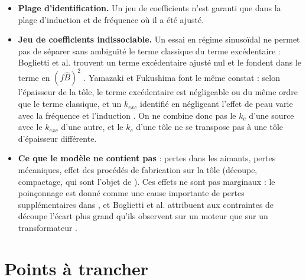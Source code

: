 \documentclass[11pt,a4paper]{article}
\newcommand{\Bc}{\hat{B}}
\begin{document}
\begin{itemize}
    \item \textbf{Plage d'identification.} Un jeu de coefficients n'est garanti que dans la plage d'induction et de fréquence où il a été ajusté.
    \item \textbf{Jeu de coefficients indissociable.} Un essai en régime sinusoïdal ne permet pas de séparer sans ambiguïté le terme classique du terme excédentaire : Boglietti et al. trouvent un terme excédentaire ajusté nul et le fondent dans le terme en $(f\Bc)^2$ \cite[\S~IV]{Bog03}. Yamazaki et Fukushima font le même constat : selon l'épaisseur de la tôle, le terme excédentaire est négligeable ou du même ordre que le terme classique, et un $k_{exc}$ identifié en négligeant l'effet de peau varie avec la fréquence et l'induction \cite[\S~II-B, Table~I et Fig.~2]{Yam10}. On ne combine donc pas le $k_c$ d'une source avec le $k_{exc}$ d'une autre, et le $k_c$ d'une tôle ne se transpose pas à une tôle d'épaisseur différente.
    \item \textbf{Ce que le modèle ne contient pas} : pertes dans les aimants, pertes mécaniques, effet des procédés de fabrication sur la tôle (découpe, compactage, qui sont l'objet de \cite{Hel21}). Ces effets ne sont pas marginaux : le poinçonnage est donné comme une cause importante de pertes supplémentaires dans \cite{Mar25}, et Boglietti et al. attribuent aux contraintes de découpe l'écart plus grand qu'ils observent sur un moteur que sur un transformateur \cite[\S~IX]{Bog03}.
\end{itemize}

\section{Points à trancher}\label{sec-ouvert}
\end{document}
